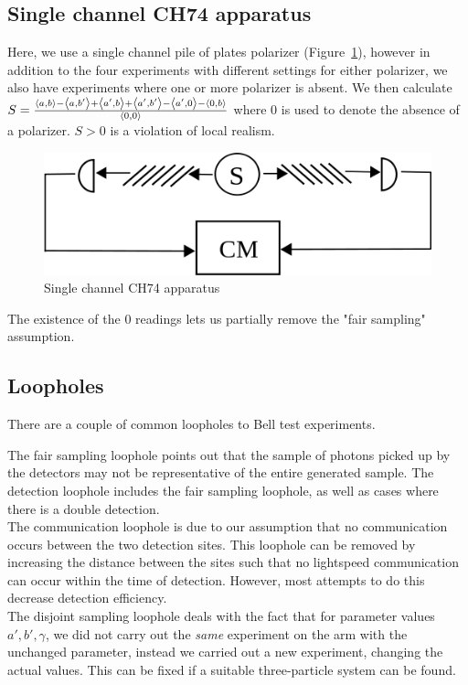 \documentclass[10pt, twocolumn]{article}
\begin{document}
\subsection{Single channel CH74 apparatus}
Here, we use a single channel pile of plates polarizer (Figure~\ref{fig:ch74}), however in addition to the four experiments with different settings for either polarizer, we also have experiments where one or more polarizer is absent. We then calculate $S=\frac{\Braket{a,b}-\Braket{a,b'}+\Braket{a',b}+\Braket{a',b'}-\Braket{a',0}
-\Braket{0,b}}{\Braket{0,0}}$ where $0$ is used to denote the absence of a polarizer. $S>0$ is a violation of local realism.
\begin{figure}
\centering
\includegraphics[scale=0.5]{ch74-1ch}
\caption{Single channel CH74 apparatus}
\label{fig:ch74}
\end{figure}

The existence of the $0$ readings lets us partially remove\cite{ch74} the "fair sampling" assumption.
\subsection{Loopholes}
There are a couple of common loopholes to Bell test experiments.

The fair sampling loophole points out that the sample of photons picked up by the detectors may not be representative of the entire generated sample. The detection loophole includes the fair sampling loophole, as well as cases where there is a double detection.\\

The communication loophole is due to our assumption that no communication occurs between the two detection sites. This loophole can be removed by increasing the distance between the sites such that no lightspeed communication can occur within the time of detection. However, most attempts to  do this decrease detection efficiency.\\

The disjoint sampling loophole deals with the fact that for parameter values $a',b',\gamma$, we did not carry out the \emph{same} experiment on the arm with the unchanged parameter, instead we carried out a new experiment, changing the actual values. This can be fixed if a suitable three-particle system can be found.
\end{document}
